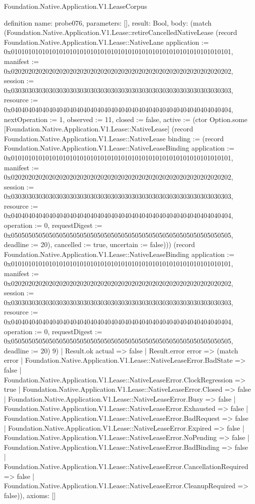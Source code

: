 \begin{lexlean}{Foundation.Native.Application.V1.LeaseCorpus}
\begin{semanticmodule}
definition{
  name: probe076,
  parameters: [],
  result: Bool,
  body: (match (Foundation.Native.Application.V1.Lease::retireCancelledNativeLease (record Foundation.Native.Application.V1.Lease::NativeLane {application := 0x0101010101010101010101010101010101010101010101010101010101010101, manifest := 0x0202020202020202020202020202020202020202020202020202020202020202, session := 0x0303030303030303030303030303030303030303030303030303030303030303, resource := 0x0404040404040404040404040404040404040404040404040404040404040404, nextOperation := 1, observed := 11, closed := false, active := (ctor Option.some [Foundation.Native.Application.V1.Lease::NativeLease] (record Foundation.Native.Application.V1.Lease::NativeLease {binding := (record Foundation.Native.Application.V1.Lease::NativeLeaseBinding {application := 0x0101010101010101010101010101010101010101010101010101010101010101, manifest := 0x0202020202020202020202020202020202020202020202020202020202020202, session := 0x0303030303030303030303030303030303030303030303030303030303030303, resource := 0x0404040404040404040404040404040404040404040404040404040404040404, operation := 0, requestDigest := 0x0505050505050505050505050505050505050505050505050505050505050505, deadline := 20}), cancelled := true, uncertain := false}))}) (record Foundation.Native.Application.V1.Lease::NativeLeaseBinding {application := 0x0101010101010101010101010101010101010101010101010101010101010101, manifest := 0x0202020202020202020202020202020202020202020202020202020202020202, session := 0x0303030303030303030303030303030303030303030303030303030303030303, resource := 0x0404040404040404040404040404040404040404040404040404040404040404, operation := 0, requestDigest := 0x0505050505050505050505050505050505050505050505050505050505050505, deadline := 20}) 9)
    | Result.ok actual => false
    | Result.error error => (match error
      | Foundation.Native.Application.V1.Lease::NativeLeaseError.BadState => false
      | Foundation.Native.Application.V1.Lease::NativeLeaseError.ClockRegression => true
      | Foundation.Native.Application.V1.Lease::NativeLeaseError.Closed => false
      | Foundation.Native.Application.V1.Lease::NativeLeaseError.Busy => false
      | Foundation.Native.Application.V1.Lease::NativeLeaseError.Exhausted => false
      | Foundation.Native.Application.V1.Lease::NativeLeaseError.BadRequest => false
      | Foundation.Native.Application.V1.Lease::NativeLeaseError.Expired => false
      | Foundation.Native.Application.V1.Lease::NativeLeaseError.NoPending => false
      | Foundation.Native.Application.V1.Lease::NativeLeaseError.BadBinding => false
      | Foundation.Native.Application.V1.Lease::NativeLeaseError.CancellationRequired => false
      | Foundation.Native.Application.V1.Lease::NativeLeaseError.CleanupRequired => false)),
  axioms: []
}


\end{semanticmodule}
\end{lexlean}
